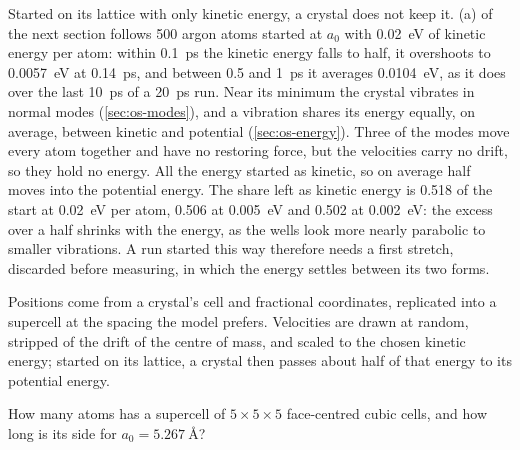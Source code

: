 Started on its lattice with only kinetic energy, a crystal does not keep
it. (a) of the next section follows 500 argon atoms
started at $a_0$ with \SI{0.02}{\electronvolt} of kinetic energy per atom:
within \SI{0.1}{\pico\second} the kinetic energy falls to half, it
overshoots to \SI{0.0057}{\electronvolt} at \SI{0.14}{\pico\second}, and
between 0.5 and \SI{1}{\pico\second} it averages
\SI{0.0104}{\electronvolt}, as it does over the last \SI{10}{\pico\second}
of a \SI{20}{\pico\second} run. Near its minimum the crystal vibrates in
normal modes (\cref{sec:os-modes}), and a vibration shares its energy
equally, on average, between kinetic and potential (\cref{sec:os-energy}).
Three of the modes move every atom together and have no restoring force,
but the velocities carry no drift, so they hold no energy. All the energy started as kinetic, so on average
half moves into the potential energy. The share left as kinetic energy is
0.518 of the start at \SI{0.02}{\electronvolt} per atom, 0.506 at
\SI{0.005}{\electronvolt} and 0.502 at \SI{0.002}{\electronvolt}: the
excess over a half shrinks with the energy, as the wells look more nearly
parabolic to smaller vibrations. A run started this way therefore needs a
first stretch, discarded before measuring, in which the energy settles
between its two forms.

\begin{keyidea}
Positions come from a crystal's cell and fractional coordinates,
replicated into a supercell at the spacing the model prefers. Velocities
are drawn at random, stripped of the drift of the centre of mass, and
scaled to the chosen kinetic energy; started on its lattice, a crystal
then passes about half of that energy to its potential energy.
\end{keyidea}


\begin{selfcheck}
How many atoms has a supercell of $5\times5\times5$ face-centred cubic
cells, and how long is its side for $a_0 = \SI{5.267}{\angstrom}$?
\end{selfcheck}
